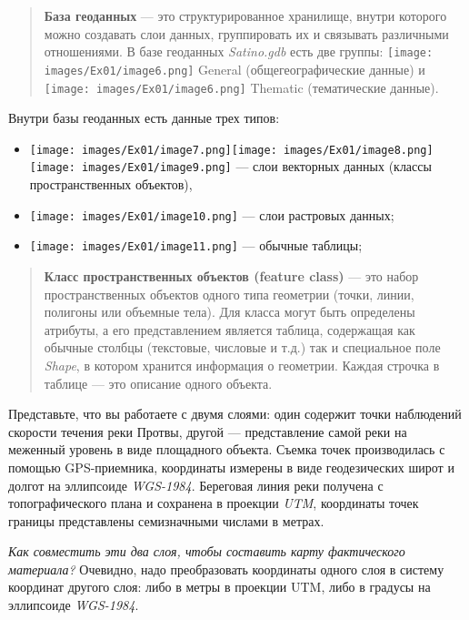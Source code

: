 \documentclass[12pt,]{book}
\providecommand{\tightlist}{%
  \setlength{\itemsep}{0pt}\setlength{\parskip}{0pt}}
\begin{document}
\begin{quote}
\textbf{База геоданных} --- это структурированное хранилище, внутри которого можно создавать слои данных, группировать их и связывать различными отношениями. В базе геоданных \emph{Satino.gdb} есть две группы: \texttt{[image: images/Ex01/image6.png]} General (общегеографические данные) и \texttt{[image: images/Ex01/image6.png]} Thematic (тематические данные).
\end{quote}

Внутри базы геоданных есть данные трех типов:

\begin{itemize}
\tightlist
\item
  \texttt{[image: images/Ex01/image7.png]}\texttt{[image: images/Ex01/image8.png]}\texttt{[image: images/Ex01/image9.png]} --- слои векторных данных (классы пространственных объектов),
\item
  \texttt{[image: images/Ex01/image10.png]} --- слои растровых данных;
\item
  \texttt{[image: images/Ex01/image11.png]} --- обычные таблицы;
\end{itemize}

\begin{quote}
\textbf{Класс пространственных объектов (feature class)} --- это набор пространственных объектов одного типа геометрии (точки, линии, полигоны или объемные тела). Для класса могут быть определены атрибуты, а его представлением является таблица, содержащая как обычные столбцы (текстовые, числовые и т.д.) так и специальное поле \emph{Shape}, в котором хранится информация о геометрии. Каждая строчка в таблице --- это описание одного объекта.
\end{quote}

Представьте, что вы работаете с двумя слоями: один содержит точки наблюдений скорости течения реки Протвы, другой --- представление самой реки на меженный уровень в виде площадного объекта. Съемка точек производилась с помощью GPS-приемника, координаты измерены в виде геодезических широт и долгот на эллипсоиде \emph{WGS-1984}. Береговая линия реки получена с топографического плана и сохранена в проекции \emph{UTM}, координаты точек границы представлены семизначными числами в метрах.

\emph{Как совместить эти два слоя, чтобы составить карту фактического материала?} Очевидно, надо преобразовать координаты одного слоя в систему координат другого слоя: либо в метры в проекции UTM, либо в градусы на эллипсоиде \emph{WGS-1984}.
\end{document}
